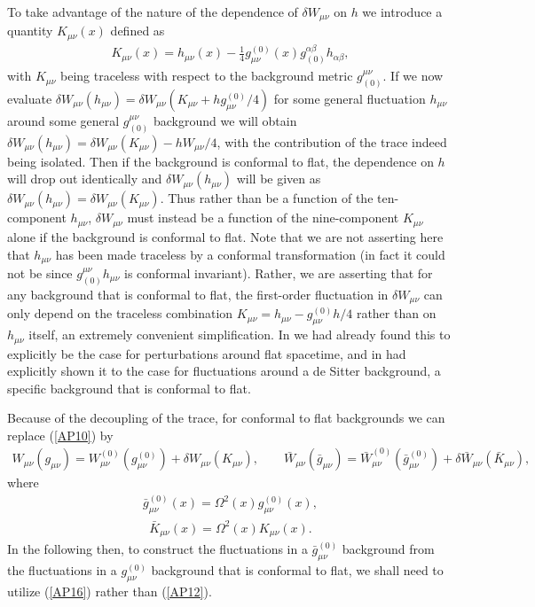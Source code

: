 \documentclass[aps]{revtex4}
\begin{document}
To take advantage of the nature of the dependence of $\delta W_{\mu\nu}$ on $h$ we introduce a quantity $K_{\mu\nu}(x)$ defined as 
%
\begin{eqnarray}
K_{\mu\nu}(x)=h_{\mu\nu}(x)-\frac{1}{4}g^{(0)}_{\mu\nu}(x)g_{(0)}^{\alpha\beta}h_{\alpha\beta},
\label{AP13}
\end{eqnarray}
%
with $K_{\mu\nu}$ being traceless with respect to the background metric $g_{(0)}^{\mu\nu}$. If we now evaluate $\delta W_{\mu\nu}(h_{\mu\nu})=\delta W_{\mu\nu}(K_{\mu\nu}+hg^{(0)}_{\mu\nu}/4)$ for some general fluctuation $h_{\mu\nu}$ around some general $g_{(0)}^{\mu\nu}$ background we will obtain $\delta W_{\mu\nu}(h_{\mu\nu})=\delta W_{\mu\nu}(K_{\mu\nu})-hW_{\mu\nu}/4$, with the contribution of the trace indeed being isolated. Then if the background is conformal to flat, the dependence on $h$ will drop out identically and $\delta W_{\mu\nu}(h_{\mu\nu})$ will be given as $\delta W_{\mu\nu}(h_{\mu\nu})=\delta W_{\mu\nu}(K_{\mu\nu})$. Thus rather than be a function of the ten-component $h_{\mu\nu}$, $\delta W_{\mu\nu}$ must instead be a function of the nine-component $K_{\mu\nu}$ alone if the background is conformal to flat. Note that we are not asserting here that $h_{\mu\nu}$ has been made traceless by a conformal transformation (in fact it could not be since $g_{(0)}^{\mu\nu}h_{\mu\nu}$ is conformal invariant). Rather, we are asserting that for any background that is conformal to flat, the first-order fluctuation in $\delta W_{\mu\nu}$ can only depend on the traceless combination $K_{\mu\nu}=h_{\mu\nu}-g^{(0)}_{\mu\nu}h/4$ rather than on $h_{\mu\nu}$ itself, an extremely convenient simplification. In \cite{Mannheim2006} we had already found this to explicitly be the case for perturbations around flat spacetime, and in \cite{Mannheim2012a} had explicitly shown it to the case for fluctuations around a de Sitter background, a specific background that is conformal to flat.  

Because of the decoupling of the trace,  for conformal to flat backgrounds we can replace (\ref{AP10}) by 
%
\begin{eqnarray}
W_{\mu\nu}(g_{\mu\nu})= W^{(0)}_{\mu\nu}(g^{(0)}_{\mu\nu})+\delta W_{\mu\nu}(K_{\mu\nu}),\qquad
\bar{W}_{\mu\nu}(\bar{g}_{\mu\nu})=\bar{W}^{(0)}_{\mu\nu}(\bar{g}^{(0)}_{\mu\nu})+\delta\bar{W}_{\mu\nu}(\bar{K}_{\mu\nu}),
\label{AP14}
\end{eqnarray}
%
where
%
\begin{eqnarray}
\bar{g}^{(0)}_{\mu\nu}(x)=\Omega^2(x)g^{(0)}_{\mu\nu}(x),
\label{AP15}
\end{eqnarray}
% 
%
\begin{eqnarray}
\bar{K}_{\mu\nu}(x)=\Omega^2(x)K_{\mu\nu}(x).
\label{AP16}
\end{eqnarray}
% 
In the following then, to construct the fluctuations in a $\bar{g}^{(0)}_{\mu\nu}$ background from the fluctuations in a $g^{(0)}_{\mu\nu}$ background that is conformal to flat, we shall need to utilize (\ref{AP16}) rather than (\ref{AP12}). 
\end{document}
